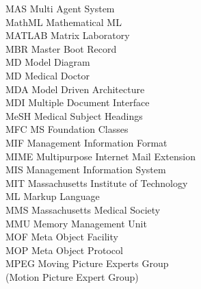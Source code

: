 \begin{tabbing}
    \>MAS \>\>Multi Agent System\\

    \>MathML \>\>Mathematical ML\\

    \>MATLAB \>\>Matrix Laboratory\\

    \>MBR \>\>Master Boot Record\\

    \>MD \>\>Model Diagram\\

    \>MD \>\>Medical Doctor\\

    \>MDA \>\>Model Driven Architecture\\

    \>MDI \>\>Multiple Document Interface\\

    \>MeSH \>\>Medical Subject Headings\\

    \>MFC \>\>MS Foundation Classes\\

    \>MIF \>\>Management Information Format\\

    \>MIME \>\>Multipurpose Internet Mail Extension\\

    \>MIS \>\>Management Information System\\

    \>MIT \>\>Massachusetts Institute of Technology\\

    \>ML \>\>Markup Language\\

    \>MMS \>\>Massachusetts Medical Society\\

    \>MMU \>\>Memory Management Unit\\

    \>MOF \>\>Meta Object Facility\\

    \>MOP \>\>Meta Object Protocol\\


    \>MPEG \>\>Moving Picture Experts Group\\
        \>\>\>(Motion Picture Expert Group)\\


\end{tabbing}

